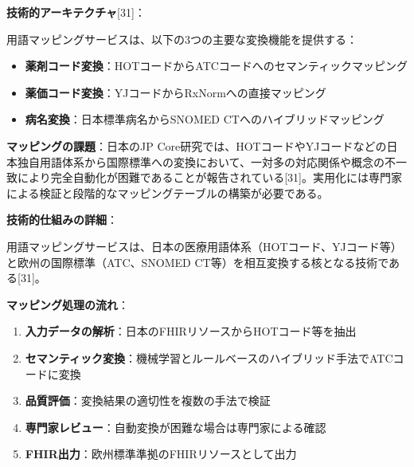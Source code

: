\documentclass[
  a4paper,
  a4paper,
  11pt]{ltjsbook}
\providecommand{\tightlist}{%
  \setlength{\itemsep}{0pt}\setlength{\parskip}{0pt}}
\begin{document}
\textbf{技術的アーキテクチャ}{[}31{]}：

用語マッピングサービスは、以下の3つの主要な変換機能を提供する：

\begin{itemize}
\tightlist
\item
  \textbf{薬剤コード変換}：HOTコードからATCコードへのセマンティックマッピング
\item
  \textbf{薬価コード変換}：YJコードからRxNormへの直接マッピング
\item
  \textbf{病名変換}：日本標準病名からSNOMED CTへのハイブリッドマッピング
\end{itemize}

\begin{tcolorbox}[enhanced jigsaw, toprule=.15mm, bottomtitle=1mm, coltitle=black, left=2mm, opacityback=0, arc=.35mm, colbacktitle=quarto-callout-note-color!10!white, colback=white, opacitybacktitle=0.6, bottomrule=.15mm, rightrule=.15mm, breakable, title=\textcolor{quarto-callout-note-color}{\faInfo}\hspace{0.5em}{Note}, toptitle=1mm, titlerule=0mm, colframe=quarto-callout-note-color-frame, leftrule=.75mm]

\textbf{マッピングの課題}：日本のJP
Core研究では、HOTコードやYJコードなどの日本独自用語体系から国際標準への変換において、一対多の対応関係や概念の不一致により完全自動化が困難であることが報告されている{[}31{]}。実用化には専門家による検証と段階的なマッピングテーブルの構築が必要である。

\end{tcolorbox}

\textbf{技術的仕組みの詳細}：

用語マッピングサービスは、日本の医療用語体系（HOTコード、YJコード等）と欧州の国際標準（ATC、SNOMED
CT等）を相互変換する核となる技術である{[}31{]}。

\textbf{マッピング処理の流れ}：

\begin{enumerate}
\def\labelenumi{\arabic{enumi}.}
\tightlist
\item
  \textbf{入力データの解析}：日本のFHIRリソースからHOTコード等を抽出
\item
  \textbf{セマンティック変換}：機械学習とルールベースのハイブリッド手法でATCコードに変換
\item
  \textbf{品質評価}：変換結果の適切性を複数の手法で検証
\item
  \textbf{専門家レビュー}：自動変換が困難な場合は専門家による確認
\item
  \textbf{FHIR出力}：欧州標準準拠のFHIRリソースとして出力
\end{enumerate}
\end{document}
